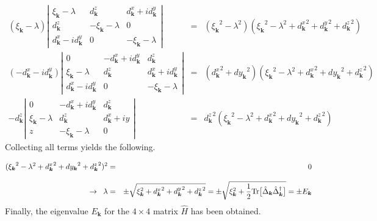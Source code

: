 \documentclass[uplatex,a4j,12pt,dvipdfmx]{jsarticle}
\begin{document}
\begin{eqnarray}
	({\xi_{\bm{k}}} - \lambda)
	\left|
	\begin{array}{ccc}
		{\xi_{\bm{k}}} - \lambda             & {d^{z}_{\bm{k}}}          & {d^{x}_{\bm{k}}} + i{d^{y}_{\bm{k}}} \\[2mm]
		{d^{z}_{\bm{k}}}                     & - {\xi_{\bm{k}}} -\lambda & 0                                    \\[2mm]
		{d^{x}_{\bm{k}}} - i{d^{y}_{\bm{k}}} & 0                         & - {\xi_{\bm{k}}} -\lambda
	\end{array}
	\right|
	&=&
	( {\xi_{\bm{k}}}^{2} - \lambda^{2} )
	( {\xi_{\bm{k}}}^{2} - \lambda^{2} + {d^{x}_{\bm{k}}}^{2} +{d^{y}_{\bm{k}}}^{2} + {d^{z}_{\bm{k}}}^{2} )
	\\[3mm]
	(- {d^{x}_{\bm{k}}} - i{d^{y}_{\bm{k}}})
	\left|
	\begin{array}{ccc}
		0                                    & - {d^{x}_{\bm{k}}} + i{d^{y}_{\bm{k}}} & {d^{z}_{\bm{k}}}                     \\[2mm]
		{\xi_{\bm{k}}} - \lambda             & {d^{z}_{\bm{k}}}                       & {d^{x}_{\bm{k}}} + i{d^{y}_{\bm{k}}} \\[2mm]
		{d^{x}_{\bm{k}}} - i{d^{y}_{\bm{k}}} & 0                                      & - {\xi_{\bm{k}}} -\lambda
	\end{array}
	\right|
	&=&
	({d^{x}_{\bm{k}}}^{2} +{d{y}_{\bm{k}}}^{2})
	( {\xi_{\bm{k}}}^{2} - \lambda^{2} + {d^{x}_{\bm{k}}}^{2} +{d{y}_{\bm{k}}}^{2} + {d^{z}_{\bm{k}}}^{2} )
	\\[3mm]
	-
	{d^{z}_{\bm{k}}}
	\left|
	\begin{array}{ccc}
		0                        & - {d^{x}_{\bm{k}}} + i{d^{y}_{\bm{k}}} & {d^{z}_{\bm{k}}}      \\[2mm]
		{\xi_{\bm{k}}} - \lambda & {d^{z}_{\bm{k}}}                       & {d^{x}_{\bm{k}}} + iy \\[2mm]
		z                        & - {\xi_{\bm{k}}} -\lambda              & 0
	\end{array}
	\right|
	&=&
	{d^{z}_{\bm{k}}}^{2}
	( {\xi_{\bm{k}}}^{2} - \lambda^{2} + {d^{x}_{\bm{k}}}^{2} +{d{y}_{\bm{k}}}^{2} + {d^{z}_{\bm{k}}}^{2} )
\end{eqnarray}
%
Collecting all terms yields the following.

\begin{eqnarray}
	( {\xi_{\bm{k}}}^{2} - \lambda^{2} + {d^{x}_{\bm{k}}}^{2} +{d{y}_{\bm{k}}}^{2} + {d^{z}_{\bm{k}}}^{2} )^{2}
	&=&
	0
	\\[3mm]
	\to \hspace{2mm}
	\lambda
	&=&
	\pm \sqrt{ \xi_{\bm{k}}^{2} + {d^{x}_{\bm{k}}}^{2} + {d^{y}_{\bm{k}}}^{2} + {d^{z}_{\bm{k}}}^{2} }
	=
	\pm \sqrt{ \xi_{\bm{k}}^{2} + \dfrac{1}{2} {\rm Tr} \big[ \hat{\Delta}_{\bm{k}} \hat{\Delta}^{\dagger}_{\bm{k}} \big] }
	=
	\pm E_{\bm{k}}
\end{eqnarray}
%
Finally, the eigenvalue $E_{\bm{k}}$ for the $4 \times 4$ matrix $\hat{H}$ has been obtained.
\end{document}
